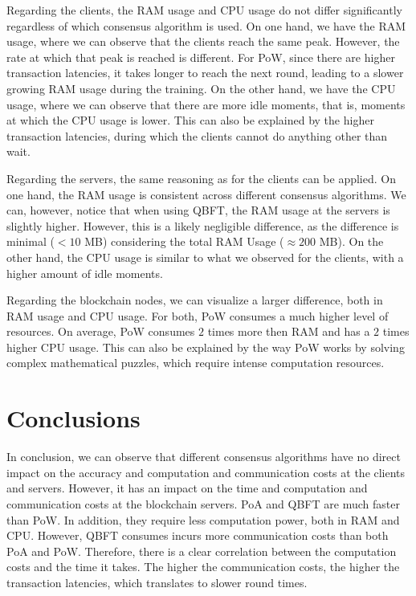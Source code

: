 Regarding the clients, the RAM usage and CPU usage do not differ significantly regardless of which consensus algorithm is used. On one hand, we have the RAM usage, where we can observe that the clients reach the same peak. However, the rate at which that peak is reached is different. For PoW, since there are higher transaction latencies, it takes longer to reach the next round, leading to a slower growing RAM usage during the training. On the other hand, we have the CPU usage, where we can observe that there are more idle moments, that is, moments at which the CPU usage is lower. This can also be explained by the higher transaction latencies, during which the clients cannot do anything other than wait.

Regarding the servers, the same reasoning as for the clients can be applied. On one hand, the RAM usage is consistent across different consensus algorithms. We can, however, notice that when using QBFT, the RAM usage at the servers is slightly higher. However, this is a likely negligible difference, as the difference is minimal ($< 10$ MB) considering the total RAM Usage ($\approx 200$ MB). On the other hand, the CPU usage is similar to what we observed for the clients, with a higher amount of idle moments.

Regarding the blockchain nodes, we can visualize a larger difference, both in RAM usage and CPU usage. For both, PoW consumes a much higher level of resources. On average, PoW consumes $2$ times more then RAM and has a $2$ times higher CPU usage. This can also be explained by the way PoW works by solving complex mathematical puzzles, which require intense computation resources.

\section{Conclusions}

In conclusion, we can observe that different consensus algorithms have no direct impact on the accuracy and computation and communication costs at the clients and servers. However, it has an impact on the time and computation and communication costs at the blockchain servers. PoA and QBFT are much faster than PoW. In addition, they require less computation power, both in RAM and CPU. However, QBFT consumes incurs more communication costs than both PoA and PoW. Therefore, there is a clear correlation between the computation costs and the time it takes. The higher the communication costs, the higher the transaction latencies, which translates to slower round times.

